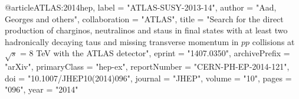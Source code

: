 @article{ATLAS:2014hep,
    label          = "ATLAS-SUSY-2013-14",
    author         = "Aad, Georges and others",
    collaboration  = "ATLAS",
    title          = "{Search for the direct production of charginos, neutralinos and staus in final states with at least two hadronically decaying taus and missing transverse momentum in $pp$ collisions at $\sqrt{s}$ = 8 TeV with the ATLAS detector}",
    eprint         = "1407.0350",
    archivePrefix  = "arXiv",
    primaryClass   = "hep-ex",
    reportNumber   = "CERN-PH-EP-2014-121",
    doi            = "10.1007/JHEP10(2014)096",
    journal        = "JHEP",
    volume         = "10",
    pages          = "096",
    year           = "2014"
}

